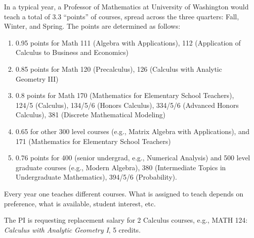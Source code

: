 \documentclass[11pt]{article}
\begin{document}
In a typical year, a Professor of Mathematics at University of
Washington would teach a total of 3.3 ``points'' of courses, spread
across the three quarters: Fall, Winter, and Spring.  The points are
determined as follows:
\begin{enumerate}
\item 0.95 points for Math 111 (Algebra with Applications), 112 (Application of Calculus to Business and Economics)
\item 0.85 points for Math 120 (Precalculus), 126 (Calculus with Analytic Geometry III)
\item 0.8 points for Math 170 (Mathematics for Elementary School Teachers), 124/5 (Calculus), 134/5/6 (Honors Calculus), 334/5/6 (Advanced Honors Calculus), 381 (Discrete Mathematical Modeling)
\item 0.65 for other 300 level courses (e.g., Matrix Algebra with Applications), and 171 (Mathematics for Elementary School Teachers)

\item 0.76 points for 400 (senior undergrad, e.g., Numerical Analysis)
  and 500 level graduate courses (e.g., Modern Algebra), 380
  (Intermediate Topics in Undergraduate Mathematics), 394/5/6
  (Probability).
\end{enumerate}

Every year one teaches different courses.  What is assigned to teach
depends on preference, what is available, student interest, etc.

The PI is requesting replacement salary for 2 Calculus courses, e.g.,
MATH 124: {\em Calculus with Analytic Geometry I}, 5 credits.

%
\end{document}
